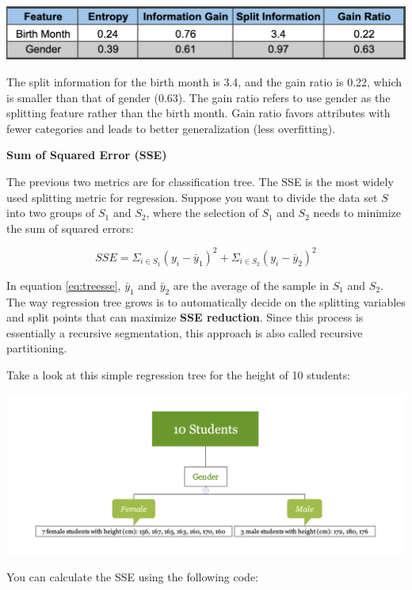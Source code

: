 \documentclass[
  12pt,
]{krantz}
\begin{document}
\includegraphics{images/infogainratioexp2.png}

The split information for the birth month is 3.4, and the gain ratio is 0.22, which is smaller than that of gender (0.63). The gain ratio refers to use gender as the splitting feature rather than the birth month. Gain ratio favors attributes with fewer categories and leads to better generalization (less overfitting).

\textbf{Sum of Squared Error (SSE)}

The previous two metrics are for classification tree. The SSE is the most widely used splitting metric for regression. Suppose you want to divide the data set \(S\) into two groups of \(S_{1}\) and \(S_{2}\), where the selection of \(S_{1}\) and \(S_{2}\) needs to minimize the sum of squared errors:

\begin{equation}
SSE=\Sigma_{i\in S_{1}}(y_{i}-\bar{y}_{1})^{2}+\Sigma_{i\in S_{2}}(y_{i}-\bar{y}_{2})^{2}
\label{eq:treesse}
\end{equation}

In equation \eqref{eq:treesse}, \(\bar{y}_{1}\) and \(\bar{y}_{2}\) are the average of the sample in \(S_{1}\) and \(S_{2}\). The way regression tree grows is to automatically decide on the splitting variables and split points that can maximize \textbf{SSE reduction}. Since this process is essentially a recursive segmentation, this approach is also called recursive partitioning.

Take a look at this simple regression tree for the height of 10 students:

\includegraphics{images/varEN.png}

You can calculate the SSE using the following code:
\end{document}
